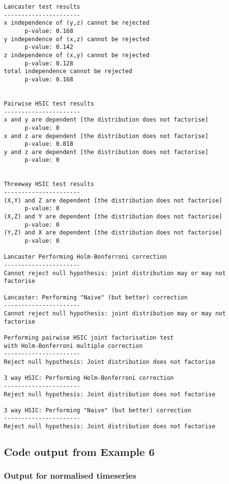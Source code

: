 \documentclass[12pt]{article}
\numberwithin{claim}{section}
\numberwithin{lemma}{section}
\numberwithin{theorem}{section}
\begin{document}
\begin{verbatim}
Lancaster test results
----------------------
x independence of (y,z) cannot be rejected
      p-value: 0.168
y independence of (x,z) cannot be rejected
      p-value: 0.142
z independence of (x,y) cannot be rejected
      p-value: 0.128
total independence cannot be rejected
      p-value: 0.168


Pairwise HSIC test results
----------------------
x and y are dependent [the distribution does not factorise]
      p-value: 0
x and z are dependent [the distribution does not factorise]
      p-value: 0.018
y and z are dependent [the distribution does not factorise]
      p-value: 0


Threeway HSIC test results
----------------------
(X,Y) and Z are dependent [the distribution does not factorise]
      p-value: 0
(X,Z) and Y are dependent [the distribution does not factorise]
      p-value: 0
(Y,Z) and X are dependent [the distribution does not factorise]
      p-value: 0

Lancaster Performing Holm-Bonferroni correction
----------------------
Cannot reject null hypothesis: joint distribution may or may not factorise

Lancaster: Performing "Naive" (but better) correction
----------------------
Cannot reject null hypothesis: joint distribution may or may not factorise

Performing pairwise HSIC joint factorisation test 
with Holm-Bonferroni multiple correction
----------------------
Reject null hypothesis: Joint distribution does not factorise

3 way HSIC: Performing Holm-Bonferroni correction
----------------------
Reject null hypothesis: Joint distribution does not factorise

3 way HSIC: Performing "Naive" (but better) correction
----------------------
Reject null hypothesis: Joint distribution does not factorise

\end{verbatim}

\newpage
\subsection{Code output from Example 6}
\subsubsection{Output for normalised timeseries}
\end{document}
